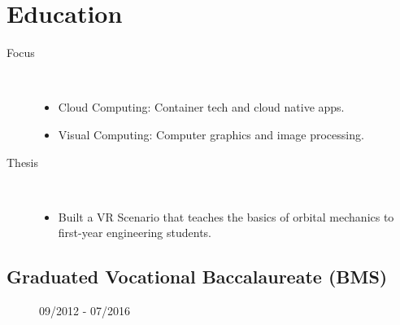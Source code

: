 \section{Education}
\vspace{0.3em}
\begin{description}
    \item[Focus]~ %
        \begin{itemize}[labelindent=\parindent, leftmargin=*] %
            \item Cloud Computing: Container tech and cloud native apps.
            \item Visual Computing: Computer graphics and image processing.
        \end{itemize}
    \item[Thesis]~ %
        \begin{itemize}[labelindent=\parindent, leftmargin=*]
            \item Built a VR Scenario that teaches the basics of orbital mechanics to first-year engineering students.
        \end{itemize}
\end{description}
\dottedline

\subsection{Graduated Vocational Baccalaureate (BMS)}
\begin{description}
    \item[\faCalendar\color{altColor}] 09/2012 - 07/2016
\end{description}

